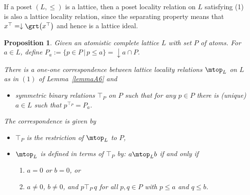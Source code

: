 \documentclass[pdftex]{sigma}
\numberwithin{equation}{section}
\newtheorem{Proposition}[Theorem]{Proposition}
\begin{document}
\begin{Remark} \label{rk:posetltt}
If a poset $(L,\leq)$ is a lattice, then a poset locality relation on $L$ satisfying (1) is also a lattice locality relation, since the separating property means that $x^\top=\downarrow \grt\big(x^\top\big)$ and hence is a lattice ideal.
\end{Remark}
\begin{Proposition}
	Given an atomistic complete lattice $L$ with set $P$ of atoms.
	For $a\in L$, define $P_a:=\{p\in P\,|\, p\leq a\}=\downarrow a \cap P$.
	
	There is a one-one correspondence between lattice locality relations $\mtop_L$ on $L$ as in $(1)$ of Lemma~{\rm \ref{lemmaA6}} and
	\begin{itemize}\itemsep=0pt
		\item [$(3)$] symmetric binary relations $\top_P$ on $P$ such that for any $p\in P$ there is (unique) $a\in L$ such that $p^{\top_P}=P_a$.
	\end{itemize}
The correspondence is given by
	\begin{itemize}\itemsep=0pt
		\item $\top_P$ is the restriction of $\mtop_L$ to $P$,
		\item $\mtop_L$ is defined in terms of $\top_P$ by: $a\mtop_L b$ if and only if
		\begin{enumerate}\itemsep=0pt
\item $a=0$ or $b=0$, or

\item $a\neq 0$, $b\neq 0$, and $p\top_P\, q$ for all $p, q\in P$ with $p\leq a$ and $q\leq b$.
		\end{enumerate}
	\end{itemize}
\end{Proposition}
\end{document}
